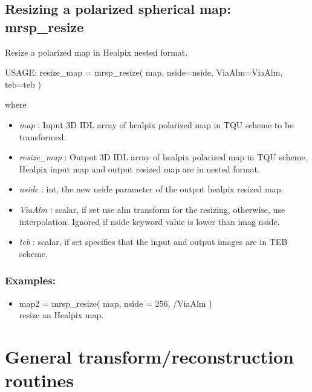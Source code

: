 \subsection{Resizing a polarized spherical map: mrsp\_resize}
Resize a polarized map in Healpix nested format.
{\bf
\begin{center}
     USAGE: resize\_map = mrsp\_resize( map, nside=nside, ViaAlm=ViaAlm, teb=teb )
\end{center}}
where
\begin{itemize}
\item {\em map} : Input 3D IDL array of healpix polarized map in TQU scheme to be transformed.
\item {\em resize\_map} : Output 3D IDL array of healpix polarized map in TQU scheme. Healpix input map and output resized map are in nested format.
\item {\em nside} : int, the new nside parameter of the output healpix resized map.
\item {\em ViaAlm} : scalar, if set use alm transform for the resizing, otherwise, use interpolation. 
Ignored if nside keyword value is lower than imag nside.
\item {\em teb} : scalar, if set specifies that the input and output images are in TEB scheme.
\end{itemize}

\subsubsection*{Examples:} 
\begin{itemize}
\item map2 = mrsp\_resize( map, nside = 256, /ViaAlm ) \\
resize an Healpix map.
\end{itemize}





\section{General transform/reconstruction routines}

